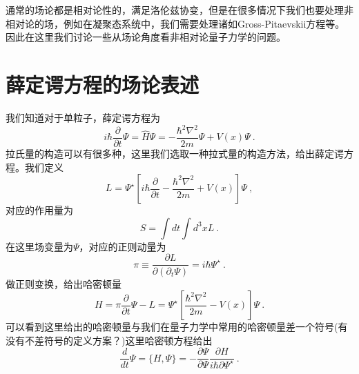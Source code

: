 
\begin{issues}
\issueDraft
\end{issues}

通常的场论都是相对论性的，满足洛伦兹协变，但是在很多情况下我们也要处理非相对论的场，例如在凝聚态系统中，我们需要处理诸如Gross-Pitaevskii方程等。因此在这里我们讨论一些从场论角度看非相对论量子力学的问题。
\section{薛定谔方程的场论表述}
我们知道对于单粒子，薛定谔方程为
\begin{equation}
i\hbar \frac{\partial}{\partial t} \Psi = \hat{H} \Psi = -\frac{\hbar^2 \nabla^2}{2m} \Psi + V(x)\Psi ~.
\end{equation}
拉氏量的构造可以有很多种，这里我们选取一种拉式量的构造方法，给出薛定谔方程。我们定义
$$
L =  \Psi^\star [i\hbar \frac{\partial}{\partial t} -\frac{\hbar^2 \nabla^2}{2m} + V(x)]\Psi~,
$$
对应的作用量为
$$
S = \int dt \int d^3 x L~.
$$
在这里场变量为$\Psi$，对应的正则动量为
$$
\pi \equiv \frac{\partial L}{\partial (\partial_t \Psi)} = i\hbar \Psi^\star~.
$$
做正则变换，给出哈密顿量
$$
H = \pi \frac{\partial}{\partial t}\Psi - L = \Psi^\star [\frac{\hbar^2 \nabla^2}{2m}- V(x)]\Psi~.
$$
可以看到这里给出的哈密顿量与我们在量子力学中常用的哈密顿量差一个符号(有没有不差符号的定义方案？)这里哈密顿方程给出
$$
\frac{d}{d t}\Psi = \{H,\Psi\} = -\frac{\partial \Psi}{\partial \Psi}\frac{\partial H}{i\hbar \partial \Psi^\star}~.
$$